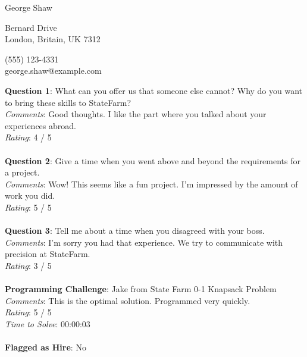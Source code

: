 \documentclass[12pt]{article}
\begin{document}
{\LARGE \begin{center}George Shaw\end{center}}

\begin{multicols}{2}
 Bernard Drive \\
London, Britain, UK 7312
\columnbreak

\noindent
(555) 123-4331 \\
george.shaw@example.com
\end{multicols}

\noindent
\textbf{Question 1}: What can you offer us that someone else cannot? Why do you want to bring these skills to StateFarm?
\\\noindent
\textit{Comments}: Good thoughts. I like the part where you talked about your experiences abroad.
\\\noindent
\textit{Rating}: 4 / 5
\\\\
\noindent
\textbf{Question 2}: Give a time when you went above and beyond the requirements for a project.
\\\noindent
\textit{Comments}: Wow! This seems like a fun project. I'm impressed by the amount of work you did.
\\\noindent
\textit{Rating}: 5 / 5
\\\\
\noindent
\textbf{Question 3}: Tell me about a time when you disagreed with your boss.
\\\noindent
\textit{Comments}: I'm sorry you had that experience. We try to communicate with precision at StateFarm.
\\\noindent
\textit{Rating}: 3 / 5
\\\\
\noindent
\textbf{Programming Challenge}: Jake from State Farm 0-1 Knapsack Problem
\\\noindent
\textit{Comments}: This is the optimal solution. Programmed very quickly.
\\\noindent
\textit{Rating}: 5 / 5
\\\noindent
\textit{Time to Solve}: 00:00:03
\\\\
\textbf{Flagged as Hire}: No
\\\\ 
\end{document}
